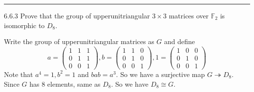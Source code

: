 \documentclass[a4paper, 12pt]{article}
\begin{document}
\noindent\rule{7in}{2.8pt}
\begin{problem}{6.6.3}
Prove that the group of upperunitriangular \(3\times 3\) matrices over \(\mathbb{F}_2\) is isomorphic to \(D_8\).
\end{problem}
\begin{solution}
Write the group of upperunitriangular matrices as \(G\) and define 
\[a=\begin{pmatrix}
    1 & 1& 1\\ 
    0 & 1& 1\\ 
    0 & 0& 1
\end{pmatrix}, b=\begin{pmatrix}
    1 & 1& 0\\ 
    0 & 1& 0\\ 
    0 & 0& 1
\end{pmatrix},1=\begin{pmatrix}
    1 & 0& 0\\ 
    0 & 1& 0\\ 
    0 & 0& 1
\end{pmatrix}\]
Note that \(a^4=1,b^2=1\) and \(bab=a^3\). So we have a surjective map \(G\twoheadrightarrow D_8\). Since \(G\) has \(8\) elements, same as \(D_8\). So we have 
\(D_8\cong G\).   
\end{solution}
\end{document}
